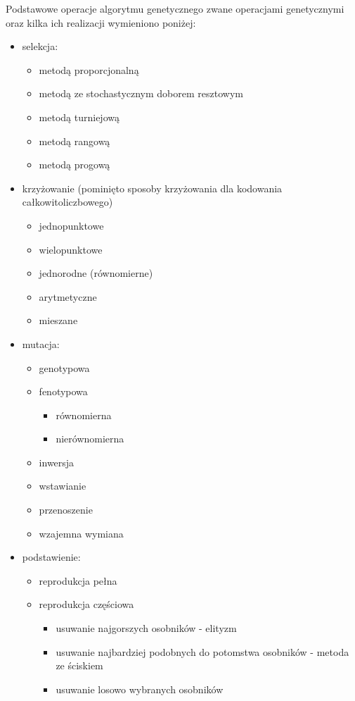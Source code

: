 Podstawowe operacje algorytmu genetycznego zwane operacjami genetycznymi oraz kilka ich realizacji wymieniono poniżej:
\begin{itemize}
	\item selekcja:
	\begin{itemize}
		\item metodą proporcjonalną
		\item metodą ze stochastycznym doborem resztowym
		\item metodą turniejową
		\item metodą rangową
		\item metodą progową
	\end{itemize}
	\item krzyżowanie (pominięto sposoby krzyżowania dla kodowania całkowitoliczbowego)
	\begin{itemize}
		\item jednopunktowe
		\item wielopunktowe
		\item jednorodne (równomierne)
		\item arytmetyczne
		\item mieszane
	\end{itemize}
	\item mutacja:
	\begin{itemize}
		\item genotypowa
		\item fenotypowa
		\begin{itemize}
			\item równomierna
			\item nierównomierna
		\end{itemize}
		\item inwersja
		\item wstawianie
		\item przenoszenie
		\item wzajemna wymiana
	\end{itemize}
	\item podstawienie:
	\begin{itemize}
		\item reprodukcja pełna
		\item reprodukcja częściowa
		\begin{itemize}
			\item usuwanie najgorszych osobników - elityzm
			\item usuwanie najbardziej podobnych do potomstwa osobników - metoda ze ściskiem
			\item usuwanie losowo wybranych osobników
		\end{itemize}
	\end{itemize}
\end{itemize} \cite{bialaszewski2012}

